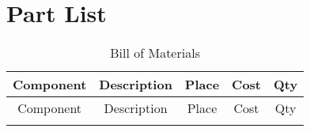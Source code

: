 \section{Part List}

\begin{center}

    \begin{longtable}{|c|c|c|c|c|}
    \caption{Bill of Materials \label{tab:partList}} \\
     \hline
    \rowcolor{Gray}
    Component & Description & Place & Cost  & Qty \\
    \hline \hline \endfirsthead
    
         \hline
    \rowcolor{Gray}
    Component & Description & Place & Cost  & Qty \\
    \hline \hline \endhead
    
    \endfoot


\end{longtable}
\end{center}
